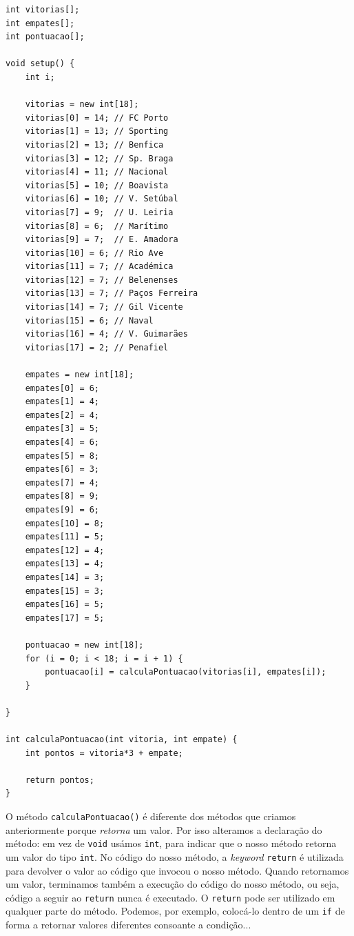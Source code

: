 \begin{lstlisting}
int vitorias[];
int empates[];
int pontuacao[];

void setup() {
    int i;
    
    vitorias = new int[18];
    vitorias[0] = 14; // FC Porto
    vitorias[1] = 13; // Sporting
    vitorias[2] = 13; // Benfica 
    vitorias[3] = 12; // Sp. Braga 
    vitorias[4] = 11; // Nacional
    vitorias[5] = 10; // Boavista
    vitorias[6] = 10; // V. Setúbal
    vitorias[7] = 9;  // U. Leiria
    vitorias[8] = 6;  // Marítimo
    vitorias[9] = 7;  // E. Amadora
    vitorias[10] = 6; // Rio Ave
    vitorias[11] = 7; // Académica
    vitorias[12] = 7; // Belenenses
    vitorias[13] = 7; // Paços Ferreira
    vitorias[14] = 7; // Gil Vicente
    vitorias[15] = 6; // Naval
    vitorias[16] = 4; // V. Guimarães
    vitorias[17] = 2; // Penafiel

    empates = new int[18];
    empates[0] = 6;
    empates[1] = 4;
    empates[2] = 4;
    empates[3] = 5;
    empates[4] = 6;
    empates[5] = 8;
    empates[6] = 3;
    empates[7] = 4;
    empates[8] = 9;
    empates[9] = 6;
    empates[10] = 8;
    empates[11] = 5;
    empates[12] = 4;
    empates[13] = 4;
    empates[14] = 3;
    empates[15] = 3;
    empates[16] = 5;
    empates[17] = 5;
    
    pontuacao = new int[18];
    for (i = 0; i < 18; i = i + 1) {
        pontuacao[i] = calculaPontuacao(vitorias[i], empates[i]);
    }

}

int calculaPontuacao(int vitoria, int empate) {
    int pontos = vitoria*3 + empate;
    
    return pontos;
}
\end{lstlisting}

O método \texttt{calculaPontuacao()} é diferente dos métodos que criamos anteriormente porque \emph{retorna} um valor. 
Por isso alteramos a declaração do método: em vez de \texttt{void} usámos \texttt{int}, para indicar que o nosso método retorna um valor do tipo \texttt{int}. 
No código do nosso método, a \emph{keyword} \texttt{return} é utilizada para devolver o valor ao código que invocou o nosso método. Quando retornamos um valor, terminamos também a execução do código do nosso método, ou seja, código a seguir ao \texttt{return} nunca é executado. O \texttt{return} pode ser utilizado em qualquer parte do método. Podemos, por exemplo, colocá-lo dentro de um \texttt{if} de forma a retornar valores diferentes consoante a condição...

